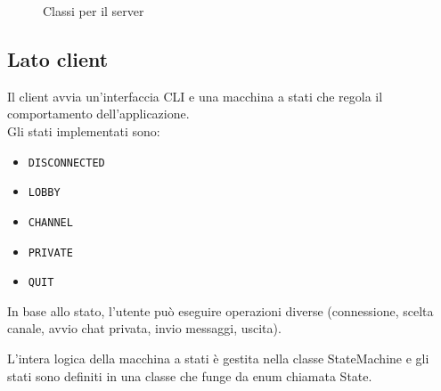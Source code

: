 \documentclass[11pt,a4paper]{article}
\begin{document}
%
%
\begin{figure}[H]
    \centering
    \caption{Classi per il server}
    \label{fig:placeholder}
\end{figure}


\subsection{Lato client}
Il client avvia un'interfaccia CLI e una macchina a stati che regola il comportamento dell'applicazione.\\
Gli stati implementati sono:
\begin{itemize}
  \item \texttt{DISCONNECTED}
  \item \texttt{LOBBY}
  \item \texttt{CHANNEL}
  \item \texttt{PRIVATE}
  \item \texttt{QUIT}
\end{itemize}

In base allo stato, l'utente può eseguire operazioni diverse (connessione, scelta canale, avvio chat privata, invio messaggi, uscita).

L'intera logica della macchina a stati è gestita nella classe StateMachine e gli stati sono definiti in una classe che funge da enum chiamata State.
\end{document}
